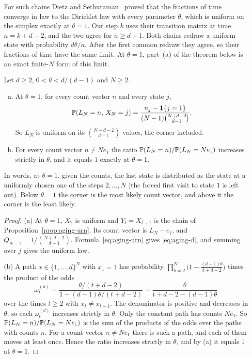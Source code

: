 For such chains Dietz and Sethuraman~\cite[Theorem~1.4]{ds2007} proved that
the fractions of time converge in law to the Dirichlet law with every
parameter $\theta$, which is uniform on the simplex exactly at $\theta=1$.
Our step $k$ uses their transition matrix at time $n=k+d-2$, and the two
agree for $n\ge d+1$. Both chains redraw a uniform state with probability
$d\theta/n$. After the first common redraw they agree, so their fractions of
time have the same limit. At
$\theta=1$, part~(a) of the theorem below is an exact finite-$N$ form of this
limit.

\begin{theorem}[$d$ states]\label{thm:aging-d}
Let $d\ge2$, $0<\theta<d/(d-1)$ and $N\ge2$.
\begin{enumerate}[(a)]
\item At $\theta=1$, for every count vector $n$ and every state $j$,
\begin{equation}\label{eq:aging-d}
 \mathbb{P}(L_N=n,\,X_N=j)=\frac{n_j-\mathbf 1\{j=1\}}{(N-1)\binom{N+d-2}{d-1}} .
\end{equation}
So $L_N$ is uniform on its $\binom{N+d-2}{d-1}$ values, the corner included.
\item For every count vector $n\ne Ne_1$ the ratio $\mathbb{P}(L_N=n)/\mathbb{P}(L_N=Ne_1)$
increases strictly in $\theta$, and it equals $1$ exactly at $\theta=1$.
\end{enumerate}
\end{theorem}

In words, at $\theta=1$, given the counts, the
last state is distributed as the state at a uniformly chosen one of the steps
$2,\dots,N$ (the forced first visit to state $1$ is left out).
Below $\theta=1$ the corner is the most likely count vector, and above it the corner
is the least likely.

\begin{proof}
(a) At $\theta=1$, $X_2$ is uniform and $Y_t=X_{t+1}$ is the chain
of Proposition~\ref{prop:aging-urn}. Its count vector is $L_N-e_1$, and
$Q_{N-1}=1/\binom{N+d-2}{d-1}$. Formula~\eqref{eq:aging-urn} gives
\eqref{eq:aging-d}, and summing over $j$ gives the uniform law.

(b) A path $x\in\{1,\dots,d\}^N$ with $x_1=1$ has probability
$\prod_{k=2}^N\bigl(1-\frac{(d-1)\theta}{k+d-2}\bigr)$ times the product of
the odds
\[
 \omega^{(d)}_t=\frac{\theta/(t+d-2)}{1-(d-1)\theta/(t+d-2)}
 =\frac{\theta}{t+d-2-(d-1)\theta}
\]
over the times $t\ge2$ with $x_t\ne x_{t-1}$. The denominator is positive and
decreases in $\theta$, so each $\omega^{(d)}_t$ increases strictly in
$\theta$. Only the constant path has counts $Ne_1$. So
$\mathbb{P}(L_N=n)/\mathbb{P}(L_N=Ne_1)$ is the sum of the products of the odds over
the paths with counts $n$. For a count vector $n\ne Ne_1$ there is such a path, and
each of them moves at least once. Hence the ratio increases strictly in
$\theta$, and by (a) it equals $1$ at $\theta=1$.
\end{proof}

